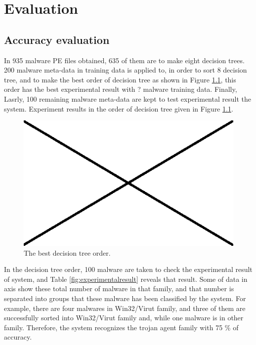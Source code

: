 \chapter{Evaluation}\label{chap:6}


\section{Accuracy evaluation}
In 935 malware PE files obtained, 635 of them are to make eight decision trees. 200 malware meta-data in training data is applied to, in order to sort $8$ decision tree, and to make the best order of decision tree as shown in Figure \ref{fig:ordertree}, this order has the best experimental result with ? malware training data. 
Finally, Lasrly, 100 remaining malware meta-data are kept to test experimental result the system.
Experiment results in the order of decision tree given	 in Figure \ref{fig:ordertree}.
\begin{figure}[httb]
  \centering
    \includegraphics[width=1\textwidth]{graph/ordertree.jpg}
     \caption{The best decision tree order.}
     \label{fig:ordertree}
\end{figure}

In the decision tree order, 100 malware are taken to check the experimental result of system, and Table \ref{fig:experimentalresult} reveals that result. Some of data in axis show these total number of malware in that family, and that number is separated into groups that these malware has been classified by the system. For example, there are four malwares in Win32/Virut family, and three of them are successfully sorted into Win32/Virut family and, while one malware is in other family. Therefore, the system recognizes the trojan agent family with 75 \% of accuracy.\\
\\

